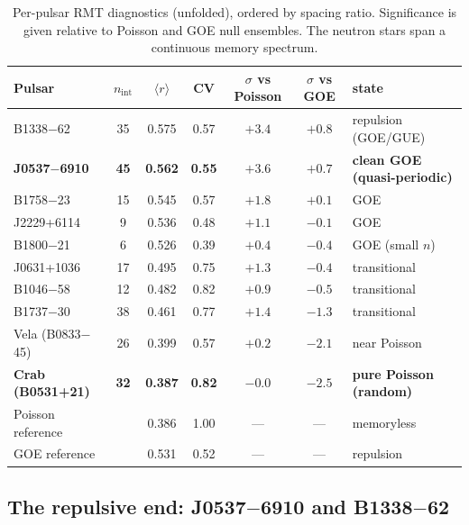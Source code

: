 \documentclass[12pt,a4paper]{article}
\begin{document}
\begin{table}[H]
\centering
\caption{Per-pulsar RMT diagnostics (unfolded), ordered by spacing ratio. Significance is given relative to Poisson and GOE null ensembles. The neutron stars span a continuous memory spectrum.}
\label{tab:main}
\small
\begin{tabular}{lcccccl}
\toprule
Pulsar & $n_{\mathrm{int}}$ & $\langle r\rangle$ & CV & $\sigma$ vs Poisson & $\sigma$ vs GOE & state \\
\midrule
B1338$-$62      & 35 & 0.575 & 0.57 & $+3.4$ & $+0.8$ & repulsion (GOE/GUE) \\
\textbf{J0537$-$6910} & \textbf{45} & \textbf{0.562} & \textbf{0.55} & $\mathbf{+3.6}$ & $\mathbf{+0.7}$ & \textbf{clean GOE (quasi-periodic)} \\
B1758$-$23      & 15 & 0.545 & 0.57 & $+1.8$ & $+0.1$ & GOE \\
J2229+6114      &  9 & 0.536 & 0.48 & $+1.1$ & $-0.1$ & GOE \\
B1800$-$21      &  6 & 0.526 & 0.39 & $+0.4$ & $-0.4$ & GOE (small $n$) \\
J0631+1036      & 17 & 0.495 & 0.75 & $+1.3$ & $-0.4$ & transitional \\
B1046$-$58      & 12 & 0.482 & 0.82 & $+0.9$ & $-0.5$ & transitional \\
B1737$-$30      & 38 & 0.461 & 0.77 & $+1.4$ & $-1.3$ & transitional \\
Vela (B0833$-$45) & 26 & 0.399 & 0.57 & $+0.2$ & $-2.1$ & near Poisson \\
\textbf{Crab (B0531+21)} & \textbf{32} & \textbf{0.387} & \textbf{0.82} & $\mathbf{-0.0}$ & $\mathbf{-2.5}$ & \textbf{pure Poisson (random)} \\
\midrule
Poisson reference & & 0.386 & 1.00 & --- & --- & memoryless \\
GOE reference     & & 0.531 & 0.52 & --- & --- & repulsion \\
\bottomrule
\end{tabular}
\end{table}

\subsection{The repulsive end: J0537$-$6910 and B1338$-$62}
\end{document}
